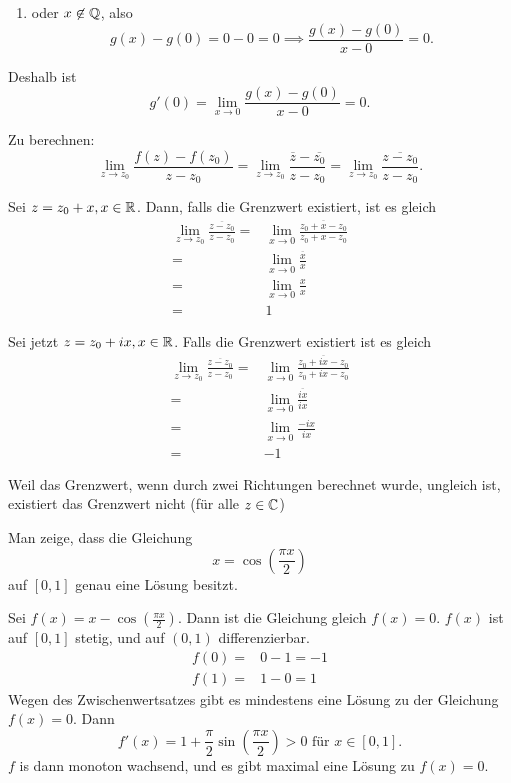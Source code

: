 \begin{parts}
\begin{enumerate}[label=(\roman*)]
		\item oder $x \not\in \mathbb{Q}$, also
			\[
			g(x)-g(0)=0-0=0\implies \frac{g(x)-g(0)}{x-0}=0
			.\] 
	\end{enumerate}
	Deshalb ist
	\[
	g'(0)=\lim_{x \to 0} \frac{g(x)-g(0)}{x-0}=0
	.\]
\item Zu berechnen:
	\[
		\lim_{z \to z_0} \frac{f(z)-f(z_0)}{z-z_0}=\lim_{z \to z_0} \frac{\overline{z}-\overline{z_0}}{z-z_0}=\lim_{z \to z_0} \frac{\overline{z-z_0}}{z-z_0}
	.\] 

	Sei $z=z_0+x, x\in \mathbb{R}$. Dann, falls die Grenzwert existiert, ist es gleich
	\begin{align*}
		\lim_{z \to z_0} \frac{\overline{z-z_0}}{z-z_0}=& \lim_{x \to 0} \frac{\overline{z_0+x-z_0}}{z_0+x-z_0}\\
		=& \lim_{x \to 0} \frac{\overline{x}}{x}\\
		=&\lim_{x \to 0} \frac{x}{x}\\
		=& 1
	\end{align*}

	Sei jetzt $z=z_0+ix, x\in \mathbb{R}$. Falls die Grenzwert existiert ist es gleich
	\begin{align*}
		\lim_{z \to z_0} \frac{\overline{z-z_0}}{z-z_0}=&\lim_{x \to 0} \frac{\overline{z_0+ix-z_0}}{z_0+ix-z_0}\\
		=& \lim_{x \to 0} \frac{\overline{ix}}{ix}\\
		=& \lim_{x \to 0} \frac{-ix}{ix} \\
		=& -1
	\end{align*}

	Weil das Grenzwert, wenn durch zwei Richtungen berechnet wurde, ungleich ist, existiert das Grenzwert nicht (f\"{u}r alle $z\in \mathbb{C}$)
\end{parts}

\begin{Problem}
	Man zeige, dass die Gleichung
	\[
	x=\cos\left( \frac{\pi x}{2} \right) \] 
	auf $[0,1]$ genau eine L\"{o}sung besitzt.
\end{Problem}

Sei $f(x)=x-\cos\left( \frac{\pi x}{2} \right) $. Dann ist die Gleichung gleich $f(x)=0$. $f(x)$ ist auf $[0,1]$ stetig, und auf $(0,1)$ differenzierbar.
\begin{align*}
	f(0)=& 0-1=-1\\
	f(1)=& 1-0=1
\end{align*}
Wegen des Zwischenwertsatzes gibt es mindestens eine L\"{o}sung zu der Gleichung $f(x)=0$. Dann
\[
	f'(x)=1+\frac{\pi}{2}\sin\left( \frac{\pi x}{2} \right) >0\text{ f\"{u}r }x\in [0,1]
.\] 
$f$ is dann monoton wachsend, und es gibt maximal eine L\"{o}sung zu $f(x)=0$.

